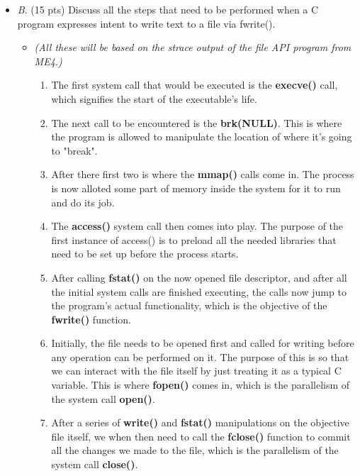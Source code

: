 \documentclass[conference]{IEEEtran}
\begin{document}
\begin{itemize}
	\item \textit{B}. (15 pts) Discuss all the steps that need to be performed when a C program expresses intent
	to write text to a file via fwrite().
	\begin{itemize} 
		\item \textit{(All these will be based on the strace output of the file API program from ME4.)} \\
		\begin{enumerate}
		\item The first system call that would be executed is the \textbf{execve()} call, which signifies the start of the executable's life. \\
		
		\item The next call to be encountered is the \textbf{brk(NULL)}. This is where the program is allowed to manipulate the location of where it's going to "break". \\
		
		\item After there first two is where the \textbf{mmap()} calls come in. The process is now alloted some part of memory inside the system for it to run and do its job. \\
		
		\item The \textbf{access()} system call then comes into play. The purpose of the first instance of access() is to preload all the needed libraries that need to be set up before the process starts. \\
		
		\item After calling \textbf{fstat()} on the now opened file descriptor, and after all the initial system calls are finished executing, the calls now jump to the program's actual functionality, which is the objective of the \textbf{fwrite()} function. \\
		
		\item Initially, the file needs to be opened first and called for writing before any operation can be performed on it. The purpose of this is so that we can interact with the file itself by just treating it as a typical C variable. This is where \textbf{fopen()} comes in, which is the parallelism of the system call \textbf{open()}. \\
		
		\item After a series of \textbf{write()} and \textbf{fstat()} manipulations on the objective file itself, we when then need to call the \textbf{fclose()} function to commit all the changes we made to the file, which is the parallelism of the system call \textbf{close()}. \\
		

\end{enumerate}
\end{itemize}
\end{itemize}
\end{document}
